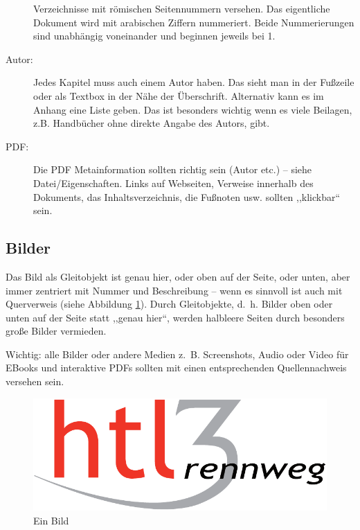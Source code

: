 \documentclass[a4paper,ngerman,naustrian,DIV=12,BCOR=1cm]{scrbook}
\begin{document}
\begin{description}
Verzeichnisse mit römischen Seitennummern versehen. Das eigentliche
Dokument wird mit arabischen Ziffern nummeriert. Beide Nummerierungen
sind unabhängig voneinander und beginnen jeweils bei 1.
\item [{Autor:}] Jedes Kapitel muss auch einem Autor haben. Das sieht man
in der Fußzeile oder als Textbox in der Nähe der Überschrift. Alternativ
kann es im Anhang eine Liste geben. Das ist besonders wichtig wenn
es viele Beilagen, z.B. Handbücher ohne direkte Angabe des Autors,
gibt.
\item [{PDF:}] Die PDF Metainformation sollten richtig sein (Autor etc.)
-- siehe Datei/Eigenschaften. Links auf Webseiten, Verweise innerhalb
des Dokuments, das Inhaltsverzeichnis, die Fußnoten usw. sollten ,,klickbar``
sein.
\end{description}

\subsection{Bilder\label{sub:Bilder}}

Das Bild als Gleitobjekt ist genau hier, oder oben auf der Seite,
oder unten, aber immer zentriert mit Nummer und Beschreibung -- wenn
es sinnvoll ist auch mit Querverweis (siehe Abbildung \ref{Bild11}).
Durch Gleitobjekte, d.~h. Bilder oben oder unten auf der Seite statt
,,genau hier``, werden halbleere Seiten durch besonders große Bilder
vermieden.

Wichtig: alle Bilder oder andere Medien z.~B. Screenshots, Audio
oder Video für EBooks und interaktive PDFs sollten mit einen entsprechenden
Quellennachweis versehen sein.

\begin{figure}[tbh]
\begin{centering}
\includegraphics[scale=0.6]{HTL3RLogoRGB}
\par\end{centering}

\protect\caption{Ein Bild}
\label{Bild11}
\end{figure}
\end{document}
